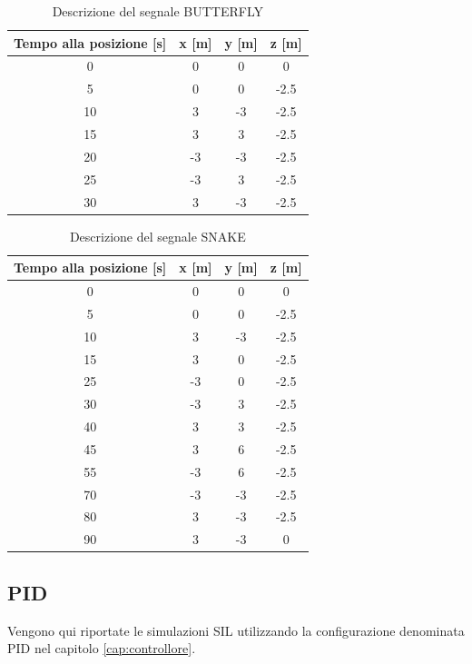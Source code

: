 \begin{table}
	\centering
	\begin{tabular}{c c c c}
		\hline
		Tempo alla posizione [s] &  x [m] & y [m] & z [m]\\
		\hline
		0 & 0 & 0 & 0 \\
		5 & 0 & 0 & -2.5 \\
		10 & 3 & -3 & -2.5 \\
		15 & 3 & 3 & -2.5 \\
		20 & -3 & -3 & -2.5 \\
		25 & -3 & 3 & -2.5 \\
		30 & 3 & -3 & -2.5 \\
		\hline
	\end{tabular}	
	\caption{Descrizione del segnale BUTTERFLY}
	\label{tab:BUTTERFLY}
\end{table}

\begin{table}
	\centering
	\begin{tabular}{c c c c}
		\hline
		Tempo alla posizione [s] &  x [m] & y [m] & z [m]\\
		\hline
		0 & 0 & 0 & 0 \\
		5 & 0 & 0 & -2.5 \\
		10 & 3 & -3 & -2.5 \\
		15 & 3 & 0 & -2.5 \\
		25 & -3 & 0 & -2.5 \\
		30 & -3 & 3 & -2.5 \\
		40 & 3 & 3 & -2.5 \\
		45 &	3 & 6 & -2.5 \\
		55 & -3 & 6 & -2.5 \\
		70 & -3 & -3 & -2.5 \\
		80 & 3 & -3 & -2.5 \\
		90 & 3 & -3 & 0 \\
		\hline
	\end{tabular}	
	\caption{Descrizione del segnale SNAKE}
	\label{tab:SNAKE}
\end{table}

\clearpage
\subsection{PID}

Vengono qui riportate le simulazioni SIL utilizzando la configurazione denominata PID nel capitolo \ref{cap:controllore}.

